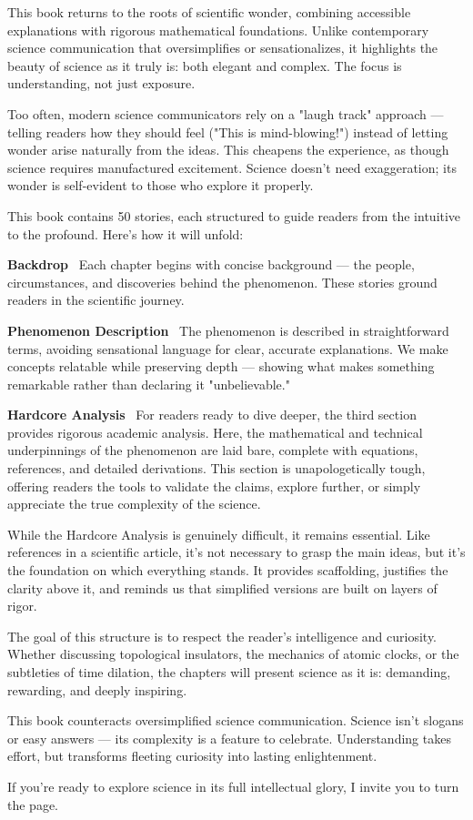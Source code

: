 This book returns to the roots of scientific wonder, combining accessible explanations with rigorous mathematical foundations. Unlike contemporary science communication that oversimplifies or sensationalizes, it highlights the beauty of science as it truly is: both elegant and complex. The focus is understanding, not just exposure.

Too often, modern science communicators rely on a "laugh track" approach — telling readers how they should feel ("This is mind-blowing!") instead of letting wonder arise naturally from the ideas. This cheapens the experience, as though science requires manufactured excitement. Science doesn't need exaggeration; its wonder is self-evident to those who explore it properly.

This book contains 50 stories, each structured to guide readers from the intuitive to the profound. Here’s how it will unfold:

\textbf{Backdrop} \ Each chapter begins with concise background — the people, circumstances, and discoveries behind the phenomenon. These stories ground readers in the scientific journey.

\textbf{Phenomenon Description} \ The phenomenon is described in straightforward terms, avoiding sensational language for clear, accurate explanations. We make concepts relatable while preserving depth — showing what makes something remarkable rather than declaring it "unbelievable."

\textbf{Hardcore Analysis} \ For readers ready to dive deeper, the third section provides rigorous academic analysis. Here, the mathematical and technical underpinnings of the phenomenon are laid bare, complete with equations, references, and detailed derivations. This section is unapologetically tough, offering readers the tools to validate the claims, explore further, or simply appreciate the true complexity of the science.

While the Hardcore Analysis is genuinely difficult, it remains essential. Like references in a scientific article, it's not necessary to grasp the main ideas, but it's the foundation on which everything stands. It provides scaffolding, justifies the clarity above it, and reminds us that simplified versions are built on layers of rigor.

The goal of this structure is to respect the reader’s intelligence and curiosity. Whether discussing topological insulators, the mechanics of atomic clocks, or the subtleties of time dilation, the chapters will present science as it is: demanding, rewarding, and deeply inspiring.

This book counteracts oversimplified science communication. Science isn't slogans or easy answers — its complexity is a feature to celebrate. Understanding takes effort, but transforms fleeting curiosity into lasting enlightenment.

If you’re ready to explore science in its full intellectual glory, I invite you to turn the page.

